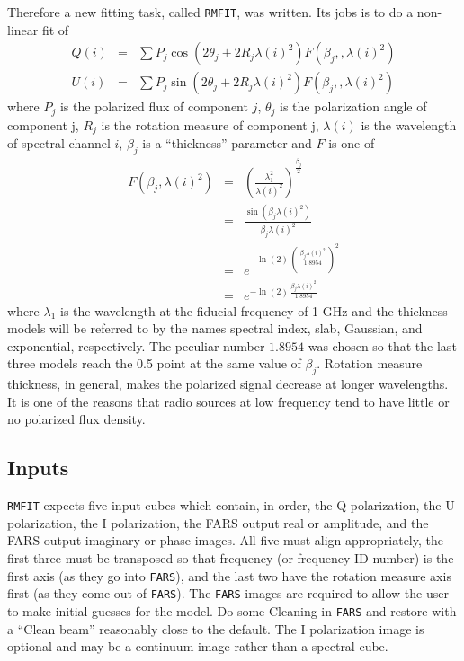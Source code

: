 \documentclass[twoside]{article}
\begin{document}
Therefore a new fitting task, called {\tt RMFIT}, was written.  Its
jobs is to do a non-linear fit of
\begin{eqnarray}
  Q(i) & = & \sum  P_j \cos (2\theta_j + 2 R_j \lambda(i)^2)
              F(\beta_j,, \lambda(i)^2) \\
  U(i) & = & \sum  P_j \sin (2\theta_j + 2 R_j \lambda(i)^2)
              F(\beta_j,, \lambda(i)^2)
\end{eqnarray}
where $P_j$ is the polarized flux of component $j$, $\theta_j$ is the
polarization angle of component j, $R_j$ is the rotation measure of
component j, $\lambda(i)$ is the wavelength of spectral channel $i$,
$\beta_j$ is a ``thickness'' parameter and $F$ is one of
\begin{eqnarray*}
F(\beta_j,\lambda(i)^2) & = & \left(
    \frac{\lambda_1^2}{\lambda(i)^2}\right) ^ {\frac{\beta_j}{2}} \\
  & = & \frac{\sin (\beta_j \lambda(i)^2)}{\beta_j \lambda(i)^2} \\
  & = & e ^ {-\ln(2)\, \left(\,\frac{\beta_j \lambda(i)^2}{1.8954}\,\right)^2} \\
  & = & e ^ {-\ln(2)\, \frac{\beta_j \lambda(i)^2}{1.8954}}
\end{eqnarray*}
where $\lambda_1$ is the wavelength at the fiducial frequency of 1 GHz
and the thickness models will be referred to by the names spectral
index, slab, Gaussian, and exponential, respectively.  The peculiar
number $1.8954$ was chosen so that the last three models reach the 0.5
point at the same value of $\beta_j$.  Rotation measure thickness, in
general, makes the polarized signal decrease at longer wavelengths.
It is one of the reasons that radio sources at low frequency tend to
have little or no polarized flux density.

\subsection{Inputs}

{\tt RMFIT} expects five input cubes which contain, in order, the Q
polarization, the U polarization, the I polarization, the FARS output
real or amplitude, and the FARS output imaginary or phase images.  All
five must align appropriately, the first three must be transposed so
that frequency (or frequency ID number) is the first axis (as they go
into {\tt FARS}), and the last two have the rotation measure axis
first (as they come out of {\tt FARS})\@.  The {\tt FARS} images are
required to allow the user to make initial guesses for the model.  Do
some Cleaning in {\tt FARS} and restore with a ``Clean beam''
reasonably close to the default.  The I polarization image is
optional and may be a continuum image rather than a spectral cube.
\end{document}
